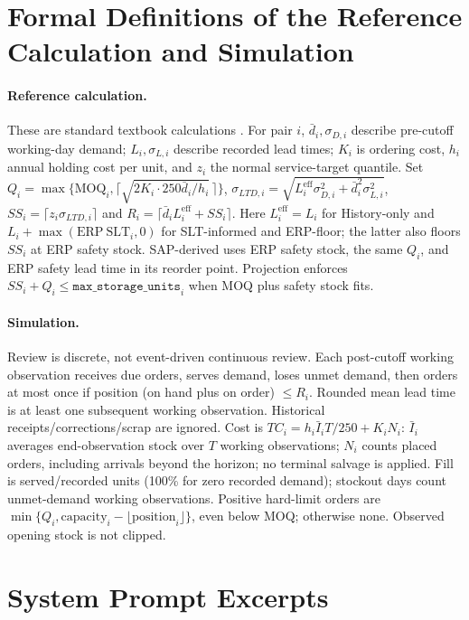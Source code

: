 \documentclass[preprint,12pt,nonatbib]{elsarticle}
\let\cite\parencite
\begin{document}
\appendix
\singlespacing
\section{Formal Definitions of the Reference Calculation and Simulation}
\label{app:math}

\paragraph{Reference calculation.}
These are standard textbook calculations \cite{silver2017inventory, axsater2015inventory}. For pair $i$, $\bar d_i,\sigma_{D,i}$ describe pre-cutoff working-day demand; $L_i,\sigma_{L,i}$ describe recorded lead times; $K_i$ is ordering cost, $h_i$ annual holding cost per unit, and $z_i$ the normal service-target quantile. Set $Q_i=\max\{\mathrm{MOQ}_i,\lceil\sqrt{2K_i\cdot250\bar d_i/h_i}\,\rceil\}$, $\sigma_{LTD,i}=\sqrt{L_i^{\mathrm{eff}}\sigma_{D,i}^2+\bar d_i^2\sigma_{L,i}^2}$, $SS_i=\lceil z_i\sigma_{LTD,i}\rceil$ and $R_i=\lceil\bar d_iL_i^{\mathrm{eff}}+SS_i\rceil$. Here $L_i^{\mathrm{eff}}=L_i$ for History-only and $L_i+\max(\mathrm{ERP\ SLT}_i,0)$ for SLT-informed and ERP-floor; the latter also floors $SS_i$ at ERP safety stock. SAP-derived uses ERP safety stock, the same $Q_i$, and ERP safety lead time in its reorder point. Projection enforces $SS_i+Q_i\le\texttt{max\_storage\_units}_i$ when MOQ plus safety stock fits.

\paragraph{Simulation.}
Review is discrete, not event-driven continuous review. Each post-cutoff working observation receives due orders, serves demand, loses unmet demand, then orders at most once if position (on hand plus on order) $\le R_i$. Rounded mean lead time is at least one subsequent working observation. Historical receipts/corrections/scrap are ignored. Cost is $TC_i=h_i\bar I_iT/250+K_iN_i$: $\bar I_i$ averages end-observation stock over $T$ working observations; $N_i$ counts placed orders, including arrivals beyond the horizon; no terminal salvage is applied. Fill is served/recorded units (100\% for zero recorded demand); stockout days count unmet-demand working observations. Positive hard-limit orders are $\min\{Q_i,\mathrm{capacity}_i-\lfloor\mathrm{position}_i\rfloor\}$, even below MOQ; otherwise none. Observed opening stock is not clipped.

\section{System Prompt Excerpts}
\label{app:prompt}
\end{document}
